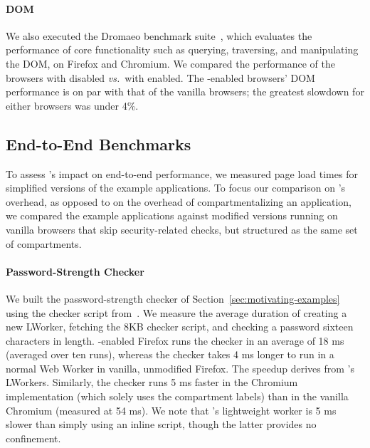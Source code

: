 \paragraph{DOM} We also executed the Dromaeo benchmark suite~\cite{dromaeo},
which evaluates the performance of core functionality
such as querying, traversing, and manipulating the DOM, on Firefox
and Chromium. We compared the performance of the browsers with
\sys{} disabled {\em vs.}~with \sys{} enabled.
%
The \sys{}-enabled browsers' DOM performance is on par with that of
the vanilla browsers; the greatest slowdown for either browsers was
under 4\%.

\subsection{End-to-End Benchmarks}
\label{sec:eval:macro}

To assess \sys{}'s impact on end-to-end performance, we measured
page load times for simplified versions of the example applications.
%
To focus our comparison on \sys{}'s overhead, as opposed to on the
overhead of compartmentalizing an application, we compared the example
applications against modified versions running on vanilla browsers
that skip security-related checks, but structured as the same set of
compartments.
%

\paragraph{Password-Strength Checker}
%
We built the password-strength checker of
Section~\ref{sec:motivating-examples} using the checker script
from~\cite{checker1}.
%
We measure the average duration of creating a new LWorker, fetching
the 8KB checker script, and checking a password sixteen characters in
length.
%
\sys{}-enabled Firefox runs the checker in an average of 18 ms (averaged
over ten runs), whereas the checker takes 4 ms longer to run in a
normal Web Worker in vanilla, unmodified Firefox. The speedup derives
from \sys{}'s LWorkers.
%
%
Similarly, the checker runs 5 ms faster in the \sys{} Chromium
implementation (which solely uses the compartment labels) than in the
vanilla Chromium (measured at 54 ms).
%
We note that \sys{}'s lightweight worker is 5 ms slower than simply
using an inline script, though the latter provides no confinement.

